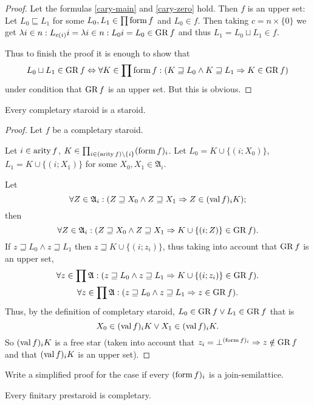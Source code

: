 \begin{proof}
Let the formulas \ref{cary-main} and \ref{cary-zero} hold. Then
$f$ is an upper set: Let $L_{0}\sqsubseteq L_{1}$ for some $L_{0},L_{1}\in\prod\operatorname{form} f$
and $L_{0}\in f$. Then taking $c=n\times\{0\}$ we get $\lambda i\in n:L_{c(i)}i=\lambda i\in n:L_{0}i=L_{0}\in\operatorname{GR} f$
and thus $L_{1}=L_{0}\sqcup L_{1}\in f$.

Thus to finish the proof it is enough to show that 
\[
L_{0}\sqcup L_{1}\in\operatorname{GR} f\Leftrightarrow\forall K\in\prod\operatorname{form} f:(K\sqsupseteq L_{0}\wedge K\sqsupseteq L_{1}\Rightarrow K\in\operatorname{GR} f)
\]
under condition that $\operatorname{GR} f$ is an upper set. But this is obvious.\end{proof}
\begin{prop}
Every completary staroid is a staroid.\end{prop}
\begin{proof}
Let $f$ be a completary staroid.

Let $i\in\operatorname{arity} f$, $K\in\prod_{i\in(\operatorname{arity} f)\setminus\{i\}}(\operatorname{form} f)_{i}$.
Let $L_{0}=K\cup\{(i;X_{0})\}$, $L_{1}=K\cup\{(i;X_{1})\}$ for some
$X_{0},X_{1}\in\mathfrak{A}_{i}$.

Let 
\[
\forall Z\in\mathfrak{A}_{i}:(Z\sqsupseteq X_{0}\wedge Z\sqsupseteq X_{1}\Rightarrow Z\in(\operatorname{val} f)_{i}K);
\]
then 
\[
\forall Z\in\mathfrak{A}_{i}:(Z\sqsupseteq X_{0}\wedge Z\sqsupseteq X_{1}\Rightarrow K\cup\{(i;Z)\}\in\operatorname{GR} f).
\]
If $z\sqsupseteq L_{0}\wedge z\sqsupseteq L_{1}$ then $z\sqsupseteq K\cup\{(i;z_{i})\}$,
thus taking into account that $\operatorname{GR} f$ is an upper set,
\begin{gather*}
\forall z\in\prod\mathfrak{A}:(z\sqsupseteq L_{0}\wedge z\sqsupseteq L_{1}\Rightarrow K\cup\{(i;z_{i})\}\in\operatorname{GR} f).\\
\forall z\in\prod\mathfrak{A}:(z\sqsupseteq L_{0}\wedge z\sqsupseteq L_{1}\Rightarrow z\in\operatorname{GR} f).
\end{gather*}
Thus, by the definition of completary staroid, $L_{0}\in\operatorname{GR} f\vee L_{1}\in\operatorname{GR} f$
that is 
\[
X_{0}\in(\operatorname{val} f)_{i}K\vee X_{1}\in(\operatorname{val} f)_{i}K.
\]
So $(\operatorname{val} f)_{i}K$ is a free star (taken into account that $z_{i}=\bot^{(\operatorname{form} f)_{i}}\Rightarrow z\notin\operatorname{GR} f$
and that $(\operatorname{val} f)_{i}K$ is an upper set).\end{proof}
\begin{xca}
Write a simplified proof for the case if every $(\operatorname{form} f)_{i}$ is
a join-semilattice.\end{xca}
\begin{lem}
Every finitary prestaroid is completary.\end{lem}
